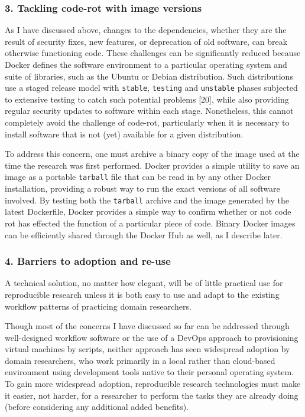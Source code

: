 \documentclass[9pt]{components/acm_proc_article-sp}
\begin{document}
\subsubsection{3. Tackling code-rot with image
versions}\label{tackling-code-rot-with-image-versions}

As I have discussed above, changes to the dependencies, whether they are
the result of security fixes, new features, or deprecation of old
software, can break otherwise functioning code. These challenges can be
significantly reduced because Docker defines the software environment to
a particular operating system and suite of libraries, such as the Ubuntu
or Debian distribution. Such distributions use a staged release model
with \texttt{stable}, \texttt{testing} and \texttt{unstable} phases
subjected to extensive testing to catch such potential problems
{[}20{]}, while also providing regular security updates to software
within each stage. Nonetheless, this cannot completely avoid the
challenge of code-rot, particularly when it is necessary to install
software that is not (yet) available for a given distribution.

To address this concern, one must archive a binary copy of the image
used at the time the research was first performed. Docker provides a
simple utility to save an image as a portable \texttt{tarball} file that
can be read in by any other Docker installation, providing a robust way
to run the exact versions of all software involved. By testing both the
\texttt{tarball} archive and the image generated by the latest
Dockerfile, Docker provides a simple way to confirm whether or not code
rot has effected the function of a particular piece of code. Binary
Docker images can be efficiently shared through the Docker Hub as well,
as I describe later.

\subsubsection{4. Barriers to adoption and
re-use}\label{barriers-to-adoption-and-re-use}

A technical solution, no matter how elegant, will be of little practical
use for reproducible research unless it is both easy to use and adapt to
the existing workflow patterns of practicing domain researchers.

Though most of the concerns I have discussed so far can be addressed
through well-designed workflow software or the use of a DevOps approach
to provisioning virtual machines by scripts, neither approach has seen
widespread adoption by domain researchers, who work primarily in a local
rather than cloud-based environment using development tools native to
their personal operating system. To gain more widespread adoption,
reproducible research technologies must make it easier, not harder, for
a researcher to perform the tasks they are already doing (before
considering any additional added benefits).
\end{document}
